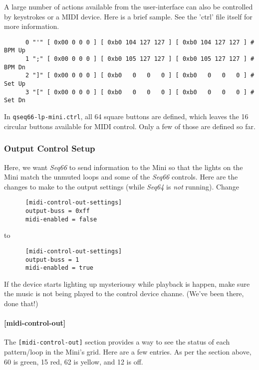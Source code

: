    A large number of actions available from the user-interface can also be
   controlled by keystrokes or a MIDI device.  Here is a brief sample.  See the
   'ctrl' file itself for more information.

   \begin{verbatim}
      0 "'" [ 0x00 0 0 0 ] [ 0xb0 104 127 127 ] [ 0xb0 104 127 127 ] # BPM Up
      1 ";" [ 0x00 0 0 0 ] [ 0xb0 105 127 127 ] [ 0xb0 105 127 127 ] # BPM Dn
      2 "]" [ 0x00 0 0 0 ] [ 0xb0   0   0   0 ] [ 0xb0   0   0   0 ] # Set Up
      3 "[" [ 0x00 0 0 0 ] [ 0xb0   0   0   0 ] [ 0xb0   0   0   0 ] # Set Dn
   \end{verbatim}

   In \texttt{qseq66-lp-mini.ctrl}, all 64 square buttons are defined, which
   leaves the 16 circular buttons available for MIDI control. Only a few of those
   are defined so far.

\subsubsection{Output Control Setup}
\label{subsubsec:launchpad_mini_output_control_setup}

   Here, we want \textsl{Seq66} to send information to the Mini
   so that the lights on the Mini match the unmuted loops and 
   some of the \textsl{Seq66} controls.  Here are the changes to make to the
   output settings (while \textsl{Seq64} is \textsl{not} running).
   Change

   \begin{verbatim}
      [midi-control-out-settings]
      output-buss = 0xff
      midi-enabled = false
   \end{verbatim}

   to

   \begin{verbatim}
      [midi-control-out-settings]
      output-buss = 1
      midi-enabled = true
   \end{verbatim}

   If the device starts lighting up mysteriousy while playback is happen, make
   sure the music is not being played to the control device channe.
   (We've been there, done that!)

\paragraph{[midi-control-out]}
\label{paragraph:patterns_midi_control_out}

   The \texttt{[midi-control-out]} section provides a way to see the status of
   each pattern/loop in the Mini's grid.  Here are a few entries. As per the
   section above, 60 is green, 15 red, 62 is yellow, and 12 is off.

